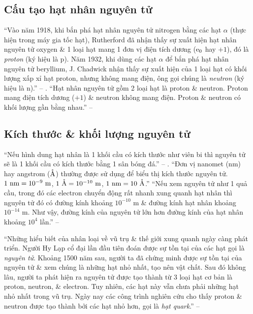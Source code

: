 \documentclass[oneside]{book}
\numberwithin{equation}{section}
\begin{document}
\subsection{Cấu tạo hạt nhân nguyên tử}
``Vào năm 1918, khi bắn phá hạt nhân nguyên tử nitrogen bằng các hạt $\alpha$ (thực hiện trong máy gia tốc hạt), Rutherford đã nhận thấy sự xuất hiện hạt nhân nguyên tử oxygen \& 1 loại hạt mang 1 đơn vị điện tích dương (${\rm e}_0$ hay $+1$), đó là \textit{proton} (ký hiệu là p). Năm 1932, khi dùng các hạt $\alpha$ để bắn phá hạt nhân nguyên tử beryllium, J. Chadwick nhận thấy sự xuất hiện của 1 loại hạt có khối lượng xấp xỉ hạt proton, nhưng không mang điện, ông gọi chúng là \textit{neutron} (ký hiệu là n).'' -- \cite[pp. 16--17]{SGK_Hoa_Hoc_10_Chan_Troi_Sang_Tao}. ``Hạt nhân nguyên tử gồm 2 loại hạt là proton \& neutron. Proton mang điện tích dương ($+1$) \& neutron không mang điện. Proton \& neutron có khối lượng gần bằng nhau.'' -- \cite[p. 17]{SGK_Hoa_Hoc_10_Chan_Troi_Sang_Tao}

\subsection{Kích thước \& khối lượng nguyên tử}
``Nếu hình dung hạt nhân là 1 khối cầu có kích thước như viên bi thì nguyên tử sẽ là 1 khối cầu có kích thước bằng 1 sân bóng đá.'' -- \cite[p. 17]{SGK_Hoa_Hoc_10_Chan_Troi_Sang_Tao}. ``Đơn vị nanomet (nm) hay angstrom ($\mathring{\rm A}$) thường được sử dụng để biểu thị kích thước nguyên tử. $\rm 1\ nm = 10^{-9}\ m$, $\rm 1\ \mathring{\rm A} = 10^{-10}\ m$, $\rm 1\ nm = 10\ \mathring{\rm A}$.'' ``Nếu xem nguyên tử như 1 quả cầu, trong đó các electron chuyển động rất nhanh xung quanh hạt nhân thì nguyên tử đó có đường kính khoảng $10^{-10}$ m \& đường kính hạt nhân khoảng $10^{-14}$ m. Như vậy, đường kính của nguyên tử lớn hơn đường kính của hạt nhân khoảng $10^4$ lần.'' -- \cite[p. 18]{SGK_Hoa_Hoc_10_Chan_Troi_Sang_Tao}

``Những hiểu biết của nhân loại về vũ trụ \& thế giới xung quanh ngày càng phát triển. Người Hy Lạp cổ đại lần đầu tiên đoán được sự tồn tại của các hạt gọi là \textit{nguyên tử}. Khoảng 1500 năm sau, người ta đã chứng minh được sự tồn tại của nguyên tử \& xem chúng là những hạt nhỏ nhất, tạo nên vật chất. Sau đó không lâu, người ta phát hiện ra nguyên tử được tạo thành từ 3 loại hạt cơ bản là proton, neutron, \& electron. Tuy nhiên, các hạt này vẫn chưa phải những hạt nhỏ nhất trong vũ trụ. Ngày nay các công trình nghiên cứu cho thấy proton \& neutron được tạo thành bởi các hạt nhỏ hơn, gọi là \textit{hạt quark}.'' -- \cite[p. 18]{SGK_Hoa_Hoc_10_Chan_Troi_Sang_Tao}
\end{document}
